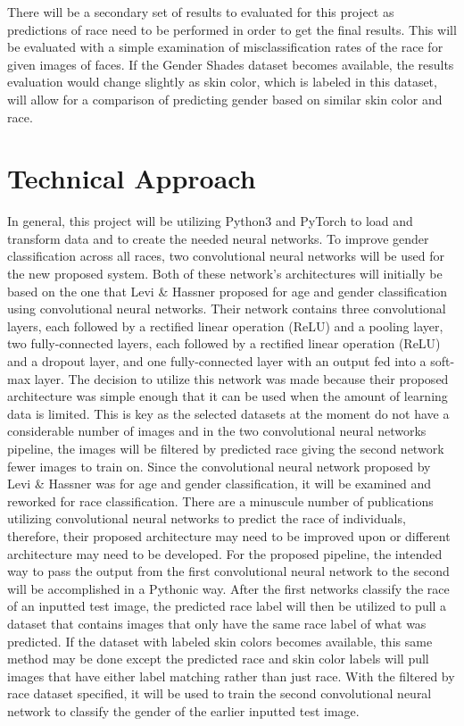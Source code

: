 \documentclass[10pt,twocolumn,letterpaper]{article}
\begin{document}
There will be a secondary set of results to evaluated for this project as predictions of race need to be performed in order to get the final results. This will be evaluated with a simple examination of misclassification rates of the race for given images of faces. If the Gender Shades dataset becomes available, the results evaluation would change slightly as skin color, which is labeled in this dataset, will allow for a comparison of predicting gender based on similar skin color and race. 

\section{Technical Approach}

In general, this project will be utilizing Python3 and PyTorch to load and transform data and to create the needed neural networks. To improve gender classification across all races, two convolutional neural networks will be used for the new proposed system. Both of these network’s architectures will initially be based on the one that Levi \& Hassner \cite{Authors14b} proposed for age and gender classification using convolutional neural networks. Their network contains three convolutional layers, each followed by a rectified linear operation (ReLU) and a pooling layer, two fully-connected layers, each followed by a rectified linear operation (ReLU) and a dropout layer, and one fully-connected layer with an output fed into a soft-max layer. The decision to utilize this network was made because their proposed architecture was simple enough that it can be used when the amount of learning data is limited. This is key as the selected datasets at the moment do not have a considerable number of images and in the two convolutional neural networks pipeline, the images will be filtered by predicted race giving the second network fewer images to train on. Since the convolutional neural network proposed by Levi \& Hassner was for age and gender classification, it will be examined and reworked for race classification. There are a minuscule number of publications utilizing convolutional neural networks to predict the race of individuals, therefore, their proposed architecture may need to be improved upon or different architecture may need to be developed. 
For the proposed pipeline, the intended way to pass the output from the first convolutional neural network to the second will be accomplished in a Pythonic way. After the first networks classify the race of an inputted test image, the predicted race label will then be utilized to pull a dataset that contains images that only have the same race label of what was predicted. If the dataset with labeled skin colors becomes available, this same method may be done except the predicted race and skin color labels will pull images that have either label matching rather than just race. With the filtered by race dataset specified, it will be used to train the second convolutional neural network to classify the gender of the earlier inputted test image.
\end{document}
